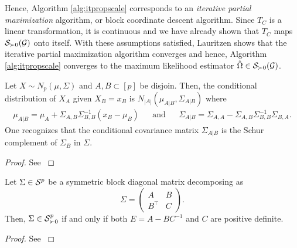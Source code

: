 Hence, Algorithm \ref{alg:itpropscale} corresponds to an \textit{iterative partial maximization} algorithm, or block coordinate descent algorithm. Since $T_C$ is a linear transformation, it is continuous and we have already shown that $T_C$ maps $\S_{\succ 0}(\G)$ onto itself. With these assumptions satisfied, Lauritzen \cite[Proposition A.3]{lauritzen1996} shows that the iterative partial maximization algorithm converges and hence, Algorithm \ref{alg:itpropscale} converges to the maximum likelihood estimator $\hat\Omega \in \S_{\succ 0}(\G)$.


\begin{lemma} \label{lem-gaussian-cond}
    Let $X \sim N_p(\mu, \Sigma)$ and $A, B \subset [p]$ be disjoin. Then, the conditional distribution of $X_A$ given $X_B = x_B$ is $N_{|A|}(\mu_{A|B}, \Sigma_{A|B})$ where
    \begin{align*}
        \mu_{A|B} = \mu_A + \Sigma_{A,B}\Sigma^{-1}_{B,B}(x_B - \mu_B) && \textrm{and} && \Sigma_{A|B} = \Sigma_{A,A} - \Sigma_{A,B}\Sigma^{-1}_{B,B}\Sigma_{B,A}.
    \end{align*} 
    One recognizes that the conditional covariance matrix $\Sigma_{A|B}$ is the Schur complement of $\Sigma_B$ in $\Sigma$.
\end{lemma}

\begin{proof}
    See \cite[Proposition C.5]{lauritzen1996}
\end{proof}

\begin{lemma} \label{lem-sym-psd}
    Let $\Sigma \in \S^p$ be a symmetric block diagonal matrix decomposing as
    \begin{equation*}
        \Sigma = \begin{pmatrix}
            A & B\\
            B^\top & C
        \end{pmatrix}.
    \end{equation*}
    Then, $\Sigma \in \S^p_{\succ 0}$ if and only if both $E = A - BC^{-1}$ and $C$ are positive definite.
\end{lemma}

\begin{proof}
    See \cite[Proposition B.1]{lauritzen1996}
\end{proof}